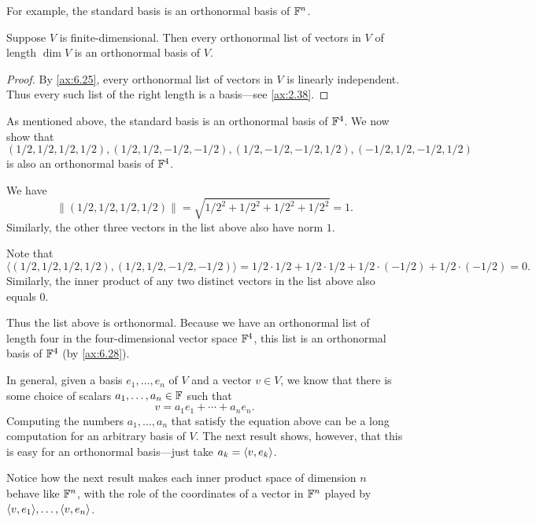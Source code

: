 For example, the standard basis is an orthonormal basis of $\mathbb{F}^n$.

\begin{result}\label{ax:6.28}
Suppose $V$ is finite-dimensional. Then every orthonormal list of vectors in $V$
of length $\dim V$ is an orthonormal basis of $V$.
\end{result}

\begin{proof}
By \ref{ax:6.25}, every orthonormal list of vectors in $V$ is linearly
independent. Thus every such list of the right length is a basis---see
\ref{ax:2.38}.
\end{proof}

\begin{example}\label{ax:6.29}
As mentioned above, the standard basis is an orthonormal basis of $\mathbb{F}^4$. We now
show that
\[ (1/2,1/2,1/2,1/2),
   (1/2,1/2,-1/2,-1/2),
   (1/2,-1/2,-1/2,1/2),
   (-1/2,1/2,-1/2,1/2) \]
is also an orthonormal basis of $\mathbb{F}^4$.

We have
\[ \bigl\lVert(1/2,1/2,1/2,1/2)\bigr\rVert
   = \sqrt{1/2^2+1/2^2+1/2^2+1/2^2} = 1. \]
Similarly, the other three vectors in the list above also have norm $1$.

Note that
\[ \bigl\langle(1/2,1/2,1/2,1/2),(1/2,1/2,-1/2,-1/2)\bigr\rangle
   = 1/2\cdot1/2+1/2\cdot1/2+1/2\cdot(-1/2)+1/2\cdot(-1/2) = 0. \]
Similarly, the inner product of any two distinct vectors in the list above also
equals $0$.

Thus the list above is orthonormal. Because we have an orthonormal list of
length four in the four-dimensional vector space $\mathbb{F}^4$, this list is an
orthonormal basis of $\mathbb{F}^4$ (by \ref{ax:6.28}).
\end{example}

In general, given a basis $e_1,\dots,e_n$ of $V$ and a vector $v\in V$, we know
that there is some choice of scalars $a_1,\dots,a_n\in\mathbb{F}$ such that
\[ v = a_1e_1+\cdots+a_ne_n. \]
Computing the numbers $a_1,\dots,a_n$ that satisfy the equation above can be a
long computation for an arbitrary basis of $V$. The next result shows, however,
that this is easy for an orthonormal basis---just take $a_k=\langle v, e_k \rangle$.

%
Notice how the next result makes each inner product space of dimension $n$
behave like $\mathbb{F}^n$, with the role of the coordinates of a vector in $\mathbb{F}^n$
played by $\langle v, e_1 \rangle,\dots,\langle v, e_n \rangle$.

